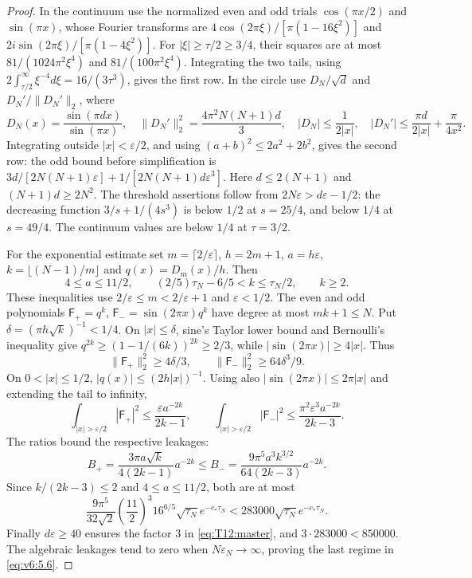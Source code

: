 \begin{proof}
In the continuum use the normalized even and odd trials
$\cos(\pi x/2)$ and $\sin(\pi x)$, whose Fourier transforms are
$4\cos(2\pi\xi)/[\pi(1-16\xi^2)]$ and
$2i\sin(2\pi\xi)/[\pi(1-4\xi^2)]$.
For $|\xi|\ge\tau/2\ge3/4$, their squares are at most
$81/(1024\pi^2\xi^4)$ and $81/(100\pi^2\xi^4)$.
Integrating the two tails, using
$2\int_{\tau/2}^\infty\xi^{-4}d\xi=16/(3\tau^3)$, gives the first row.
In the circle use $D_N/\sqrt d$ and $D_N'/\|D_N'\|_2$, where
\[
D_N(x)=\frac{\sin(\pi dx)}{\sin(\pi x)},\quad
\|D_N'\|_2^2=\frac{4\pi^2N(N+1)d}{3},\quad
|D_N|\le\frac1{2|x|},\quad
|D_N'|\le\frac{\pi d}{2|x|}+\frac\pi{4x^2}.
\]
Integrating outside $|x|<\varepsilon/2$, and using
$(a+b)^2\le2a^2+2b^2$, gives the second row:
the odd bound before simplification is
$3d/[2N(N+1)\varepsilon]+1/[2N(N+1)d\varepsilon^3]$.
Here $d\le2(N+1)$ and $(N+1)d\ge2N^2$.
The threshold assertions follow from
$2N\varepsilon>d\varepsilon-1/2$: the decreasing function
$3/s+1/(4s^3)$ is below $1/2$ at $s=25/4$, and below $1/4$
at $s=49/4$. The continuum values are below $1/4$ at $\tau=3/2$.

For the exponential estimate set
$m=\lceil2/\varepsilon\rceil$, $h=2m+1$, $a=h\varepsilon$,
$k=\lfloor(N-1)/m\rfloor$ and
$q(x)=D_m(x)/h$. Then
\[
4\le a\le11/2,\qquad
(2/5)\tau_N-6/5<k\le\tau_N/2,\qquad k\ge2.
\]
These inequalities use $2/\varepsilon\le m<2/\varepsilon+1$ and
$\varepsilon<1/2$. The even and odd polynomials
$\mathsf F_+=q^k$, $\mathsf F_-=\sin(2\pi x)q^k$ have degree at most
$mk+1\le N$. Put $\delta=(\pi h\sqrt k)^{-1}<1/4$.
On $|x|\le\delta$, sine's Taylor lower bound and Bernoulli's inequality
give $q^{2k}\ge(1-1/(6k))^{2k}\ge2/3$, while
$|\sin(2\pi x)|\ge4|x|$. Thus
\[
 \|\mathsf F_+\|_2^2\ge4\delta/3,\qquad
 \|\mathsf F_-\|_2^2\ge64\delta^3/9.
\]
On $0<|x|\le1/2$, $|q(x)|\le(2h|x|)^{-1}$.
Using also $|\sin(2\pi x)|\le2\pi|x|$ and extending the tail to infinity,
\[
\int_{|x|>\varepsilon/2}|\mathsf F_+|^2\le
\frac{\varepsilon a^{-2k}}{2k-1},\qquad
\int_{|x|>\varepsilon/2}|\mathsf F_-|^2\le
\frac{\pi^2\varepsilon^3a^{-2k}}{2k-3}.
\]
The ratios bound the respective leakages:
\[
B_+=\frac{3\pi a\sqrt k}{4(2k-1)}a^{-2k}
\le B_-=\frac{9\pi^5a^3k^{3/2}}{64(2k-3)}a^{-2k}.
\]
Since $k/(2k-3)\le2$ and $4\le a\le11/2$, both are at most
\[
\frac{9\pi^5}{32\sqrt2}\left(\frac{11}{2}\right)^3
16^{6/5}\sqrt{\tau_N}e^{-c_*\tau_N}
<283000\sqrt{\tau_N}e^{-c_*\tau_N}.
\]
Finally $d\varepsilon\ge40$ ensures the factor $3$ in
\eqref{eq:T12:master}, and $3\cdot283000<850000$.
The algebraic leakages tend to zero when $N\varepsilon_N\to\infty$,
proving the last regime in \eqref{eq:v6:5.6}.
\end{proof}

